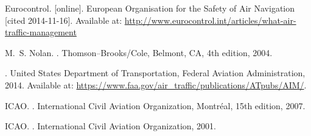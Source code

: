 \begin{thebibliography}{1}

Eurocontrol.
 [online].
\newblock European Organisation for the Safety of Air Navigation [cited 2014-11-16].
\newblock Available at: \url{http://www.eurocontrol.int/articles/what-air-traffic-management}

M.~S. Nolan.
.
\newblock Thomson--Brooks/Cole, Belmont, CA, 4th edition, 2004.

.
\newblock United States Department of Transportation, Federal Aviation Administration, 2014.
\newblock Available at: \url{https://www.faa.gov/air_traffic/publications/ATpubs/AIM/}.

ICAO.
.
\newblock International Civil Aviation Organization, Montréal, 15th edition, 2007.

ICAO.
.
\newblock International Civil Aviation Organization, 2001.






\end{thebibliography}
